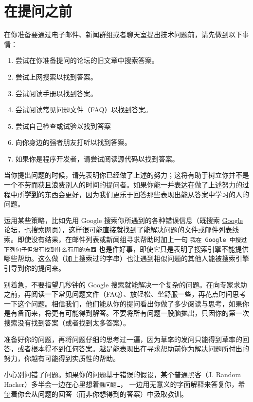 \documentclass[titlepage]{article}
\begin{document}
\hypertarget{ux5728ux63d0ux95eeux4e4bux524d}{\section{在提问之前}\label{ux5728ux63d0ux95eeux4e4bux524d}}

在你准备要通过电子邮件、新闻群组或者聊天室提出技术问题前，请先做到以下事情：

\begin{enumerate}
\def\labelenumi{\arabic{enumi}.}

\item
  尝试在你准备提问的论坛的旧文章中搜索答案。
\item
  尝试上网搜索以找到答案。
\item
  尝试阅读手册以找到答案。
\item
  尝试阅读常见问题文件（FAQ）以找到答案。
\item
  尝试自己检查或试验以找到答案
\item
  向你身边的强者朋友打听以找到答案。
\item
  如果你是程序开发者，请尝试阅读源代码以找到答案。
\end{enumerate}

当你提出问题的时候，请先表明你已经做了上述的努力；这将有助于树立你并不是一个不劳而获且浪费别人的时间的提问者。如果你能一并表达在做了上述努力的过程中所\textbf{学到}的东西会更好，因为我们更乐于回答那些表现出能从答案中学习的人的问题。

运用某些策略，比如先用 Google 搜索你所遇到的各种错误信息（既搜索
\href{http://groups.google.com/}{Google
论坛}，也搜索网页），这样很可能直接就找到了能解决问题的文件或邮件列表线索。即使没有结果，在邮件列表或新闻组寻求帮助时加上一句
\texttt{我在\ Google\ 中搜过下列句子但没有找到什么有用的东西}
也是件好事，即使它只是表明了搜索引擎不能提供哪些帮助。这么做（加上搜索过的字串）也让遇到相似问题的其他人能被搜索引擎引导到你的提问来。

别着急，不要指望几秒钟的 Google
搜索就能解决一个复杂的问题。在向专家求助之前，再阅读一下常见问题文件（FAQ）、放轻松、坐舒服一些，再花点时间思考一下这个问题。相信我们，他们能从你的提问看出你做了多少阅读与思考，如果你是有备而来，将更有可能得到解答。不要将所有问题一股脑拋出，只因你的第一次搜索没有找到答案（或者找到太多答案）。

准备好你的问题，再将问题仔细的思考过一遍，因为草率的发问只能得到草率的回答，或者根本得不到任何答案。越是能表现出在寻求帮助前你为解决问题所付出的努力，你越有可能得到实质性的帮助。

小心别问错了问题。如果你的问题基于错误的假设，某个普通黑客（J. Random
Hacker）多半会一边在心里想着\texttt{蠢问题\ldots{}}，
一边用无意义的字面解释来答复你，希望着你会从问题的回答（而非你想得到的答案）中汲取教训。
\end{document}
